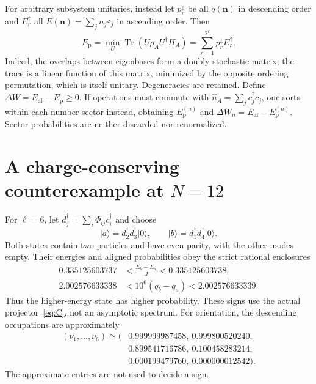 \documentclass[aps,prb,reprint,amsmath,amssymb,longbibliography,floatfix]{revtex4-2}
\newcommand{\Tr}{\operatorname{Tr}}
\newcommand{\ket}[1]{\lvert #1\rangle}
\newcommand{\al}{\mathrm{al}}
\newcommand{\pa}{\mathrm{p}}
\begin{document}
For arbitrary subsystem unitaries, instead let $p_r^\downarrow$ be all
$q(\mathbf n)$ in descending order and $E_r^\uparrow$ all
$E(\mathbf n)=\sum_j n_j\varepsilon_j$ in ascending order. Then
\begin{equation}
 E_{\pa}=\min_U\Tr(U\rho_AU^\dagger H_A)
       =\sum_{r=1}^{2^\ell}p_r^\downarrow E_r^\uparrow.
 \label{eq:passive}
\end{equation}
Indeed, the overlaps between eigenbases form a doubly stochastic matrix;
the trace is a linear function of this matrix, minimized by the opposite
ordering permutation, which is itself unitary. Degeneracies are retained.
Define $\Delta W=E_{\al}-E_{\pa}\geq0$. If operations must commute with
$\widehat n_A=\sum_jc_j^\dagger c_j$, one sorts within each number sector
instead, obtaining $E_{\pa}^{(n)}$ and
$\Delta W_n=E_{\al}-E_{\pa}^{(n)}$. Sector probabilities are neither
discarded nor renormalized.

\section{A charge-conserving counterexample at \texorpdfstring{$N=12$}{N=12}}
For $\ell=6$, let $d_j^\dagger=\sum_i\Phi_{ij}c_i^\dagger$ and choose
\begin{equation}
 \ket a=d_2^\dagger d_3^\dagger\ket{0},\qquad
 \ket b=d_1^\dagger d_4^\dagger\ket{0}.
 \label{eq:ab}
\end{equation}
Both states contain two particles and have even parity, with the other modes
empty. Their energies and aligned probabilities obey the strict rational
enclosures
\begin{align}
 0.335125603737&<\frac{E_b-E_a}{J}<0.335125603738,\nonumber\\
 2.002576633338&<10^6(q_b-q_a)<2.002576633339.
 \label{eq:gaps}
\end{align}
Thus the higher-energy state has higher probability. These signs use the
actual projector~\eqref{eq:C}, not an asymptotic spectrum. For orientation,
the descending occupations are approximately
\begin{equation}
 \begin{split}
 (\nu_1,\ldots,\nu_6)\simeq(&0.999999987458,\ 0.999800520240,\\
 &0.899541716786,\ 0.100458283214,\\
 &0.000199479760,\ 0.000000012542).
 \end{split}
\end{equation}
The approximate entries are not used to decide a sign.
\end{document}
